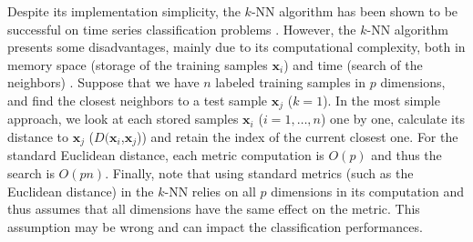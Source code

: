
Despite its implementation simplicity, the $k$-NN algorithm has been shown to be successful on time series classification problems \cite{Belongie2002,Xi2006a,Ding2008}. 
However, the $k$-NN algorithm presents some disadvantages, mainly due to its computational complexity, both in memory space (storage of the training samples $\textbf{x}_i$) and time (search of the neighbors) \cite{Duda1973}. Suppose that we have $n$ labeled training samples in $p$ dimensions, and find the closest neighbors to a test sample $\textbf{x}_j$ ($k = 1$). In the most simple approach, we look at each stored samples $\textbf{x}_i$ ($i=1,\ldots,n$) one by one, calculate its distance to $\textbf{x}_j$ ($D(\textbf{x}_i$,$\textbf{x}_j$)) and retain the index of the current closest one. For the standard Euclidean distance, each metric computation is $O(p)$ and thus the search is $O(pn)$. Finally, note that using standard metrics (such as the Euclidean distance) in the $k$-NN relies on all $p$ dimensions in its computation and thus assumes that all dimensions have the same effect on the metric. This assumption may be wrong and can impact the classification performances. 


